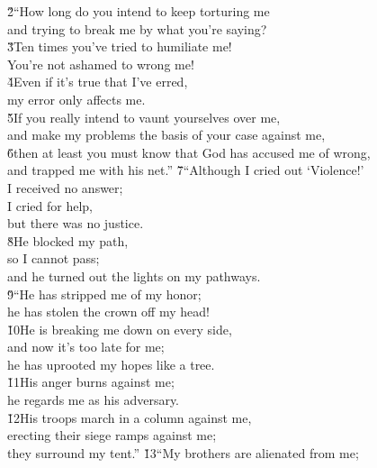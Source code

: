 \begin{poetry}
\poeml \v{2}``How long do you intend to keep torturing me \\
\poemll    and trying to break me by what you're saying? \\
\poeml \v{3}Ten times you've tried to humiliate me! \\
\poemll    You're not ashamed to wrong me! \\
\poeml \v{4}Even if it's true that I've erred, \\
\poemll    my error only affects me. \\
\poeml \v{5}If you really intend to vaunt yourselves over me, \\
\poemll    and make my problems the basis of your case against me, \\
\poeml \v{6}then at least you must know that God has accused me of wrong, \\
\poemll    and trapped me with his net.''
\poeml \v{7}``Although I cried out `Violence!' \\
\poemll    I received no answer; \\
\poeml I cried for help, \\
\poemll    but there was no justice. \\
\poeml \v{8}He blocked my path, \\
\poemll    so I cannot pass; \\
\poemlll       and he turned out the lights on my pathways. \\
\poeml \v{9}``He has stripped me of my honor; \\
\poemll    he has stolen the crown off my head! \\
\poeml \v{10}He is breaking me down on every side, \\
\poemll    and now it's too late for me; \\
\poemlll       he has uprooted my hopes like a tree. \\
\poeml \v{11}His anger burns against me; \\
\poemll    he regards me as his adversary. \\
\poeml \v{12}His troops march in a column against me, \\
\poemll    erecting their siege ramps against me; \\
\poemlll       they surround my tent.''
\poeml \v{13}``My brothers are alienated from me; \\

\end{poetry}
